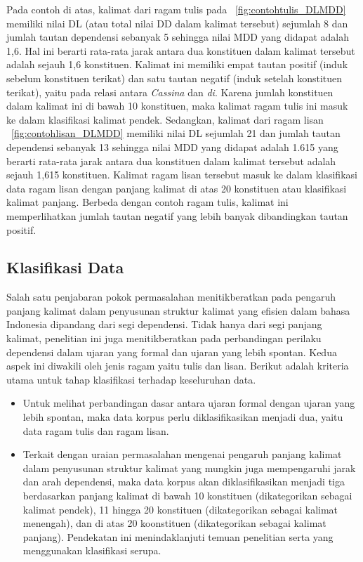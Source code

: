 Pada contoh di atas, kalimat dari ragam tulis pada \pic~\ref{fig:contohtulis_DLMDD} memiliki nilai DL (atau total nilai DD dalam kalimat tersebut) sejumlah 8 dan jumlah tautan dependensi sebanyak 5 sehingga nilai MDD yang didapat adalah 1,6. Hal ini berarti rata-rata jarak antara dua konstituen dalam kalimat tersebut adalah sejauh 1,6 konstituen. Kalimat ini memiliki empat tautan positif (induk sebelum konstituen terikat) dan satu tautan negatif (induk setelah konstituen terikat), yaitu pada relasi antara \textit{Cassina} dan \textit{di}. Karena jumlah konstituen dalam kalimat ini di bawah 10 konstituen, maka kalimat ragam tulis ini masuk ke dalam klasifikasi kalimat pendek. Sedangkan, kalimat dari ragam lisan \pic~\ref{fig:contohlisan_DLMDD} memiliki nilai DL sejumlah 21 dan jumlah tautan dependensi sebanyak 13 sehingga nilai MDD yang didapat adalah 1.615 yang berarti rata-rata jarak antara dua konstituen dalam kalimat tersebut adalah sejauh 1,615 konstituen. Kalimat ragam lisan tersebut masuk ke dalam klasifikasi data ragam lisan dengan panjang kalimat di atas 20 konstituen atau klasifikasi kalimat panjang. Berbeda dengan contoh ragam tulis, kalimat ini memperlihatkan jumlah tautan negatif yang lebih banyak dibandingkan tautan positif.

\subsection{Klasifikasi Data}
Salah satu penjabaran pokok permasalahan menitikberatkan pada pengaruh panjang kalimat dalam penyusunan struktur kalimat yang efisien dalam bahasa Indonesia dipandang dari segi dependensi. Tidak hanya dari segi panjang kalimat, penelitian ini juga menitikberatkan pada perbandingan perilaku dependensi dalam ujaran yang formal dan ujaran yang lebih spontan. Kedua aspek ini diwakili oleh jenis ragam yaitu tulis dan lisan. Berikut adalah kriteria utama untuk tahap klasifikasi terhadap keseluruhan data.

\begin{itemize}
	\item Untuk melihat perbandingan dasar antara ujaran formal dengan ujaran yang lebih spontan, maka data korpus perlu diklasifikasikan menjadi dua, yaitu data ragam tulis dan ragam lisan.
	\item Terkait dengan uraian permasalahan mengenai pengaruh panjang kalimat dalam penyusunan struktur kalimat yang mungkin juga mempengaruhi jarak dan arah dependensi, maka data korpus akan diklasifikasikan menjadi tiga berdasarkan panjang kalimat di bawah 10 konstituen (dikategorikan sebagai kalimat pendek), 11 hingga 20 konstituen (dikategorikan sebagai kalimat menengah), dan di atas 20 koonstituen (dikategorikan sebagai kalimat panjang). Pendekatan ini menindaklanjuti temuan penelitian \cite{oya2011syntactic} serta \cite{jiang2015effects} yang menggunakan klasifikasi serupa. 
\end{itemize}

